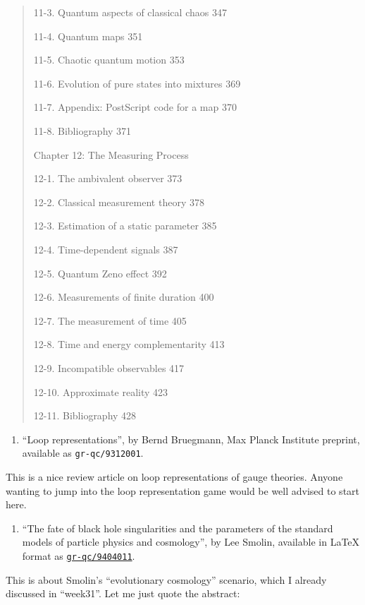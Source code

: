 \documentclass{article}
\def\tightlist{}
\begin{document}
\begin{quote}
11-3. Quantum aspects of classical chaos 347

11-4. Quantum maps 351

11-5. Chaotic quantum motion 353

11-6. Evolution of pure states into mixtures 369

11-7. Appendix: PostScript code for a map 370

11-8. Bibliography 371

Chapter 12: The Measuring Process

12-1. The ambivalent observer 373

12-2. Classical measurement theory 378

12-3. Estimation of a static parameter 385

12-4. Time-dependent signals 387

12-5. Quantum Zeno effect 392

12-6. Measurements of finite duration 400

12-7. The measurement of time 405

12-8. Time and energy complementarity 413

12-9. Incompatible observables 417

12-10. Approximate reality 423

12-11. Bibliography 428
\end{quote}

\begin{enumerate}
\def\labelenumi{\arabic{enumi})}
\setcounter{enumi}{2}
\tightlist
\item
  ``Loop representations'', by Bernd Bruegmann, Max Planck Institute
  preprint, available as \texttt{gr-qc/9312001}.
\end{enumerate}

This is a nice review article on loop representations of gauge theories.
Anyone wanting to jump into the loop representation game would be well
advised to start here.

\begin{enumerate}
\def\labelenumi{\arabic{enumi})}
\setcounter{enumi}{3}
\tightlist
\item
  ``The fate of black hole singularities and the parameters of the
  standard models of particle physics and cosmology'', by Lee Smolin,
  available in LaTeX format as
  \href{http://xxx.lanl.gov/abs/gr-qc/9404011}{\texttt{gr-qc/9404011}}.
\end{enumerate}

This is about Smolin's ``evolutionary cosmology'' scenario, which I
already discussed in ``week31''. Let me just quote the abstract:
\end{document}
